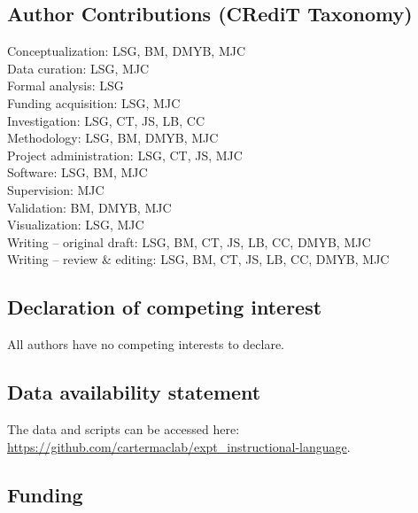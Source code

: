 \documentclass[
  doc, donotrepeattitle,floatsintext]{apa7}
\begin{document}
\newpage

\hypertarget{author-contributions-credit-taxonomy}{%
\subsection{Author Contributions (CRediT Taxonomy)}\label{author-contributions-credit-taxonomy}}

\noindent Conceptualization: LSG, BM, DMYB, MJC\\
\noindent Data curation: LSG, MJC\\
\noindent Formal analysis: LSG\\
\noindent Funding acquisition: LSG, MJC\\
\noindent Investigation: LSG, CT, JS, LB, CC\\
\noindent Methodology: LSG, BM, DMYB, MJC\\
\noindent Project administration: LSG, CT, JS, MJC\\
\noindent Software: LSG, BM, MJC\\
\noindent Supervision: MJC\\
\noindent Validation: BM, DMYB, MJC\\
\noindent Visualization: LSG, MJC\\
\noindent Writing -- original draft: LSG, BM, CT, JS, LB, CC, DMYB, MJC\\
\noindent Writing -- review \& editing: LSG, BM, CT, JS, LB, CC, DMYB, MJC

\hypertarget{declaration-of-competing-interest}{%
\subsection{Declaration of competing interest}\label{declaration-of-competing-interest}}

\noindent All authors have no competing interests to declare.

\hypertarget{data-availability-statement}{%
\subsection{Data availability statement}\label{data-availability-statement}}

\noindent The data and scripts can be accessed here: \url{https://github.com/cartermaclab/expt_instructional-language}.

\hypertarget{funding}{%
\subsection{Funding}\label{funding}}
\end{document}
